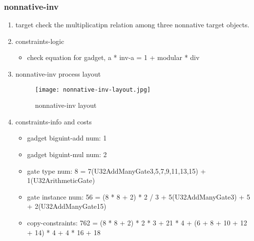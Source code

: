 \subsubsection{nonnative-inv}
\label{nonnative-inv}

\begin{enumerate}
    \item target
        check the multiplicatipn relation among three nonnative target objects.
    \item constraints-logic
        \begin{itemize}
            \item check equation for gadget,  a * inv-a = 1 + modular * div
        \end{itemize}
    \item nonnative-inv process layout
        \begin{figure}[!ht]
            \centering
            \texttt{[image: nonnative-inv-layout.jpg]}
            \caption{nonnative-inv layout}
            \label{fig:nonnative-inv-layout}
        \end{figure}
    
    \item constraints-info and costs
        \begin{itemize}
            \item gadget biguint-add num: 1
            \item gadget biguint-mul num: 2
            \item gate type num: 8 = 7(U32AddManyGate{3,5,7,9,11,13,15}) + 1(U32ArithmeticGate)
            \item gate instance num: 56 = (8 * 8 + 2) * 2 / 3 + 5(U32AddManyGate{3}) + 5 + 2(U32AddManyGate{15})
            \item copy-constraints: 762 = (8 * 8 + 2) * 2 * 3 + 21 * 4 + (6 + 8 + 10 + 12 + 14) * 4 + 4 * 16 + 18
        \end{itemize}

\end{enumerate}
